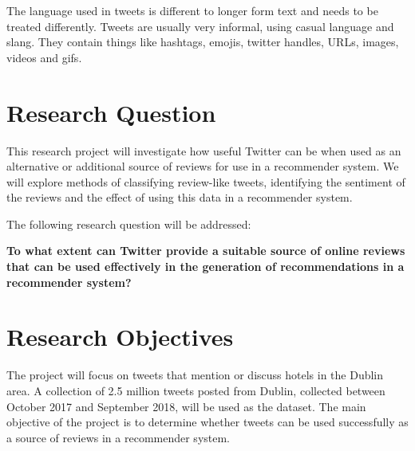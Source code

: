 
The language used in tweets is different to longer form text and needs to be treated differently. Tweets are usually very informal, using casual language and slang. They contain things like hashtags, emojis, twitter handles, URLs, images, videos and gifs.

\section{Research Question}
This research project will investigate how useful Twitter can be when used as an alternative or additional source of reviews for use in a recommender system. We will explore methods of classifying review-like tweets, identifying the sentiment of the reviews and the effect of using this data in a recommender system.

The following research question will be addressed:
\begin{center}
\textbf{To what extent can Twitter provide a suitable source of online reviews that can be used effectively in the generation of recommendations in a recommender system?}
\end{center}

\section{Research Objectives}
The project will focus on tweets that mention or discuss hotels in the Dublin area. A collection of 2.5 million tweets posted from Dublin, collected between October 2017 and September 2018, will be used as the dataset. The main objective of the project is to determine whether tweets can be used successfully as a source of reviews in a recommender system.

